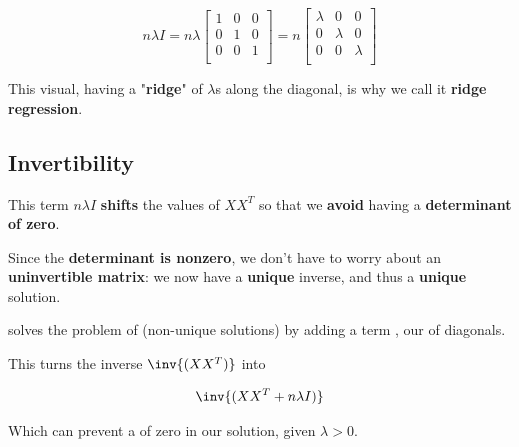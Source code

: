         \begin{equation}
            n \lambda I 
            = 
            n \lambda 
            \begin{bmatrix}
                1 & 0 & 0\\
                0 & 1 & 0\\
                0 & 0 & 1\\
            \end{bmatrix}
            =
            n
            \begin{bmatrix}
                \lambda & 0         & 0        \\
                0         & \lambda & 0        \\
                0         & 0         & \lambda\\
            \end{bmatrix}
        \end{equation}
        
        This visual, having a "\textbf{ridge}" of $\lambda$s along the diagonal, is why we call it \textbf{ridge regression}.
        
    \subsection{Invertibility}
        
        This term $n\lambda I$ \textbf{shifts} the values of $XX^T$ so that we \textbf{avoid} having a \textbf{determinant of zero}.
        
        Since the \textbf{determinant is nonzero}, we don't have to worry about an \textbf{uninvertible matrix}: we now have a \textbf{unique} inverse, and thus a \textbf{unique} solution.\\
        
        \begin{concept}
             solves the problem of  (non-unique solutions) by adding a term , our  of diagonals.
            
            This turns the inverse $\inv{(XX^T)}$ into 
            
            \begin{equation*}
                \inv{(XX^T + n \lambda I)}
            \end{equation*}
            
            Which can prevent a  of zero in our solution, given $\lambda>0$.
        \end{concept}
        
